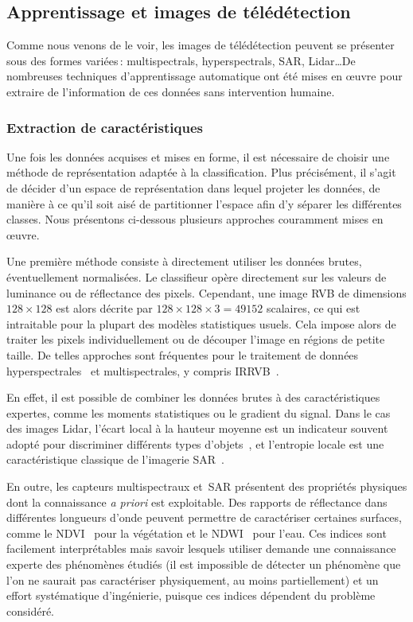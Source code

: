 \subsection{Apprentissage et images de télédétection}

Comme nous venons de le voir, les images de télédétection peuvent se présenter sous des formes variées\,: \glspl{multispectral}, \glspl{hyperspectral}, \gls{SAR}, \gls{Lidar}\dots De nombreuses techniques d'apprentissage automatique ont été mises en \oe{}uvre pour extraire de l'information de ces données sans intervention humaine.

\subsubsection{Extraction de caractéristiques}

Une fois les données acquises et mises en forme, il est nécessaire de choisir une méthode de représentation adaptée à la classification. Plus précisément, il s'agit de décider d'un espace de représentation dans lequel projeter les données, de manière à ce qu'il soit aisé de partitionner l'espace afin d'y séparer les différentes classes. Nous présentons ci-dessous plusieurs approches couramment mises en \oe{}uvre.

Une première méthode consiste à directement utiliser les données brutes, éventuellement normalisées. Le classifieur opère directement sur les valeurs de luminance ou de réflectance des pixels. Cependant, une image \gls{RVB} de dimensions $128\times128$ est alors décrite par $128\times128\times3 = 49152$ scalaires, ce qui est intraitable pour la plupart des modèles statistiques usuels. Cela impose alors de traiter les pixels individuellement ou de découper l'image en régions de petite taille. De telles approches sont fréquentes pour le traitement de données hyperspectrales~\cite{fauvel_advances_2013,ham_investigation_2005} et multispectrales, y compris \gls{IRRVB}~\cite{dechesne_semantic_2017}.

En effet, il est possible de combiner les données brutes à des caractéristiques expertes, comme les moments statistiques ou le gradient du signal. Dans le cas des images \gls{Lidar}, l'écart local à la hauteur moyenne est un indicateur souvent adopté pour discriminer différents types d'objets~\cite{guo_relevance_2011,li_lidar_2017,le_guennec_classication_2018}, et l'entropie locale est une caractéristique classique de l'imagerie \gls{SAR}~\cite{barber_sar_1991}.

En outre, les capteurs multispectraux et \gls{SAR} présentent des propriétés physiques dont la connaissance \emph{a priori} est exploitable. Des rapports de réflectance dans différentes longueurs d'onde peuvent permettre de caractériser certaines surfaces, comme le \gls{NDVI}~\cite{rouse_monitoring_1974} pour la végétation et le \gls{NDWI}~\cite{xie_new_2014} pour l'eau. Ces indices sont facilement interprétables mais savoir lesquels utiliser demande une connaissance experte des phénomènes étudiés (il est impossible de détecter un phénomène que l'on ne saurait pas caractériser physiquement, au moins partiellement) et un effort systématique d'ingénierie, puisque ces indices dépendent du problème considéré.

